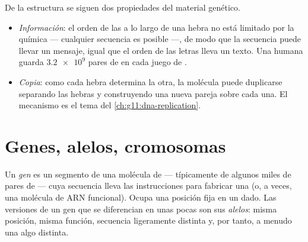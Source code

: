 \begin{proposition}\label{prop:g10:universal-dna:explains}
De la estructura se siguen dos propiedades del material genético.
\begin{itemize}
  \item \emph{Información}: el orden de las  a lo largo de una
        hebra no está limitado por la química --- cualquier secuencia
        es posible ---, de modo que la secuencia puede llevar un
        mensaje, igual que el orden de las letras lleva un texto. Una
         humana guarda $\num{3.2e9}$ pares de  en cada juego
        de .
  \item \emph{Copia}: como cada hebra determina la otra, la molécula
        puede duplicarse separando las hebras y construyendo una nueva
        pareja sobre cada una. El mecanismo es el tema del
        \cref{ch:g11:dna-replication}.
\end{itemize}
\end{proposition}
\admitted

\section{Genes, alelos, cromosomas}

\begin{definition}\label{def:g10:universal-dna:gene}
Un \emph{gen} es un segmento de una molécula de  ---
típicamente de algunos miles de pares de  --- cuya secuencia lleva
las instrucciones para fabricar una  (o, a veces, una molécula
de ARN funcional). Ocupa una posición fija en un  dado. Las
versiones de un gen que se diferencian en unas pocas  son sus
\emph{alelos}: misma posición, misma función, secuencia
ligeramente distinta y, por tanto, a menudo una  algo distinta.
\end{definition}

